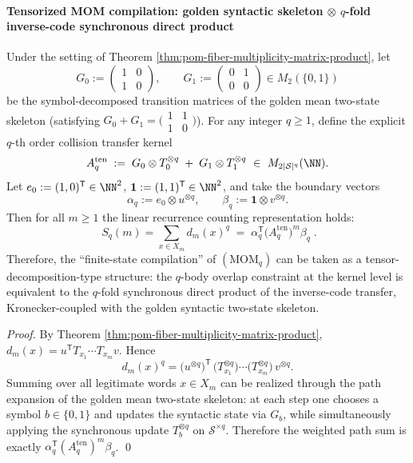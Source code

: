 \paragraph{Tensorized MOM compilation: golden syntactic skeleton \texorpdfstring{$\otimes$}{x} \(q\)-fold inverse-code synchronous direct product}
\begin{proposition}\label{prop:pom-momq-tensor-kernel-construction}
Under the setting of Theorem \ref{thm:pom-fiber-multiplicity-matrix-product}, let
\[
G_0:=\begin{pmatrix}1&0\\[2pt]1&0\end{pmatrix},
\qquad
G_1:=\begin{pmatrix}0&1\\[2pt]0&0\end{pmatrix}
\in M_2(\{0,1\})
\]
be the symbol-decomposed transition matrices of the golden mean two-state skeleton (satisfying \(G_0+G_1=\bigl(\begin{smallmatrix}1&1\\1&0\end{smallmatrix}\bigr)\)).
For any integer \(q\ge 1\), define the explicit \(q\)-th order collision transfer kernel
\[
A_q^{\mathrm{ten}}
\;:=\;
G_0\otimes T_0^{\otimes q}\;+\;G_1\otimes T_1^{\otimes q}
\ \in\ M_{2|\mathcal S|^q}(\NN).
\]
Let \(e_0:=(1,0)^{\mathsf T}\in\NN^2\), \(\mathbf 1:=(1,1)^{\mathsf T}\in\NN^2\), and take the boundary vectors
\[
\alpha_q:=e_0\otimes u^{\otimes q},
\qquad
\beta_q:=\mathbf 1\otimes v^{\otimes q}.
\]
Then for all \(m\ge 1\) the linear recurrence counting representation holds:
\[
\boxed{\;
S_q(m)=\sum_{x\in X_m}d_m(x)^q
\;=\;
\alpha_q^{\mathsf T}\bigl(A_q^{\mathrm{ten}}\bigr)^{m}\beta_q\; }.
\]
Therefore, the ``finite-state compilation'' of \((\mathrm{MOM}_q)\) can be taken as a tensor-decomposition-type structure: the \(q\)-body overlap constraint at the kernel level is equivalent to the \(q\)-fold synchronous direct product of the inverse-code transfer, Kronecker-coupled with the golden syntactic two-state skeleton.
\end{proposition}
\begin{proof}
By Theorem \ref{thm:pom-fiber-multiplicity-matrix-product},
\(
d_m(x)=u^{\mathsf T}T_{x_1}\cdots T_{x_m}v
\).
Hence
\[
d_m(x)^q
=
\bigl(u^{\otimes q}\bigr)^{\mathsf T}\,
\bigl(T_{x_1}^{\otimes q}\bigr)\cdots
\bigl(T_{x_m}^{\otimes q}\bigr)\,
v^{\otimes q}.
\]
Summing over all legitimate words \(x\in X_m\) can be realized through the path expansion of the golden mean two-state skeleton: at each step one chooses a symbol \(b\in\{0,1\}\) and updates the syntactic state via \(G_b\), while simultaneously applying the synchronous update \(T_b^{\otimes q}\) on \(\mathcal S^{\times q}\).
Therefore the weighted path sum is exactly \(\alpha_q^{\mathsf T}(A_q^{\mathrm{ten}})^m\beta_q\). \qed
\end{proof}

